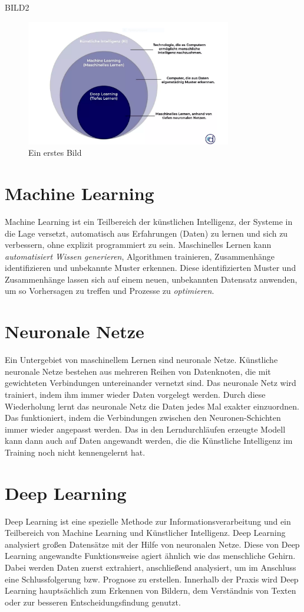 \documentclass{report}
\begin{document}
 BILD2 \begin{figure}[h]
    \centering 
    \includegraphics[width=0.8\textwidth]{ki-bestandtt.png} 
    \caption{Ein erstes Bild}
    \end{figure}

 \section{Machine Learning}
 Machine Learning ist ein Teilbereich der künstlichen Intelligenz, der Systeme in die Lage versetzt, automatisch 
 aus Erfahrungen (Daten) zu lernen und sich zu verbessern, ohne explizit programmiert zu sein.
 Maschinelles Lernen kann \textit{automatisiert Wissen generieren}, Algorithmen trainieren, Zusammenhänge identifizieren und unbekannte Muster erkennen. 
 Diese identifizierten Muster und Zusammenhänge lassen sich auf einem neuen, unbekannten Datensatz anwenden, 
 um so Vorhersagen zu treffen und Prozesse zu \textit{optimieren}.
 
 \section{Neuronale Netze}
 Ein Untergebiet von maschinellem Lernen sind neuronale Netze. Künstliche neuronale Netze bestehen aus mehreren Reihen von Datenknoten, 
 die mit gewichteten Verbindungen untereinander vernetzt sind.
 Das neuronale Netz wird trainiert, indem ihm immer wieder Daten vorgelegt werden. Durch diese Wiederholung lernt
 das neuronale Netz die Daten jedes Mal exakter einzuordnen. Das funktioniert, indem die Verbindungen
 zwischen den Neuronen-Schichten immer wieder angepasst werden. Das in den Lerndurchläufen 
 erzeugte Modell kann dann auch auf Daten angewandt werden, die die Künstliche Intelligenz im Training noch nicht kennengelernt hat.
 
 
 \section{Deep Learning} 
 Deep Learning ist eine spezielle Methode zur Informationsverarbeitung und ein Teilbereich von Machine Learning und Künstlicher 
 Intelligenz. Deep Learning analysiert großen Datensätze mit der Hilfe von neuronalen Netze. Diese von Deep Learning angewandte Funktionsweise
 agiert ähnlich wie das menschliche Gehirn. Dabei werden Daten zuerst extrahiert, anschließend analysiert, um im Anschluss eine 
 Schlussfolgerung bzw. Prognose zu erstellen. Innerhalb der Praxis wird Deep Learning hauptsächlich zum Erkennen von Bildern,
 dem Verständnis von Texten oder zur besseren Entscheidungsfindung genutzt. 
 
\end{document}

